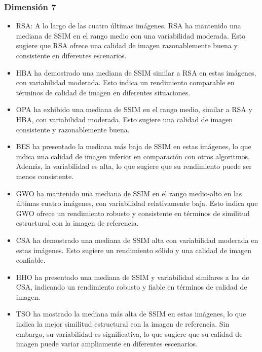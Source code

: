 \documentclass[conference]{IEEEtran}
\begin{document}
\subsubsection{Dimensión 7}
\begin{itemize}
\item RSA: A lo largo de las cuatro últimas imágenes, RSA ha mantenido una mediana de SSIM en el rango medio con una variabilidad moderada. Esto sugiere que RSA ofrece una calidad de imagen razonablemente buena y consistente en diferentes escenarios.
	
\item HBA ha demostrado una mediana de SSIM similar a RSA en estas imágenes, con variabilidad moderada. Esto indica un rendimiento comparable en términos de calidad de imagen en diferentes situaciones.
	
\item OPA ha exhibido una mediana de SSIM en el rango medio, similar a RSA y HBA, con variabilidad moderada. Esto sugiere una calidad de imagen consistente y razonablemente buena.
	
\item BES ha presentado la mediana más baja de SSIM en estas imágenes, lo que indica una calidad de imagen inferior en comparación con otros algoritmos. Además, la variabilidad es alta, lo que sugiere que su rendimiento puede ser menos consistente.
	
\item GWO ha mantenido una mediana de SSIM en el rango medio-alto en las últimas cuatro imágenes, con variabilidad relativamente baja. Esto indica que GWO ofrece un rendimiento robusto y consistente en términos de similitud estructural con la imagen de referencia.

\item CSA ha demostrado una mediana de SSIM alta con variabilidad moderada en estas imágenes. Esto sugiere un rendimiento sólido y una calidad de imagen confiable.
	
\item HHO ha presentado una mediana de SSIM y variabilidad similares a las de CSA, indicando un rendimiento robusto y fiable en términos de calidad de imagen.
	
\item TSO ha mostrado la mediana más alta de SSIM en estas imágenes, lo que indica la mejor similitud estructural con la imagen de referencia. Sin embargo, su variabilidad es significativa, lo que sugiere que su calidad de imagen puede variar ampliamente en diferentes escenarios.
	
\end{itemize}
\end{document}
